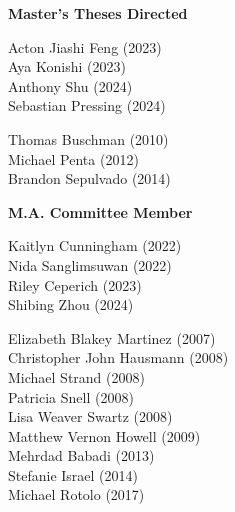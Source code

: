 
\noindent \textbf{Master's Theses Directed}

    \begin{multicols}{2}
    \noindent
    Acton Jiashi Feng (2023) \\
    Aya Konishi (2023)  \\ 	
    Anthony Shu (2024) \\
    Sebastian Pressing (2024)
\end{multicols}

    \begin{multicols}{2}
    \noindent
    Thomas Buschman (2010) \\
    Michael Penta (2012)  \\ 	
    Brandon Sepulvado (2014)
\end{multicols}
\newpage
\noindent \textbf{M.A. Committee Member}  

\begin{multicols}{2}
    \noindent
    Kaitlyn Cunningham (2022) \\
    Nida Sanglimsuwan (2022) \\
    Riley Ceperich (2023) \\
    Shibing Zhou (2024) 
\end{multicols}

\medskip
{}
\begin{multicols}{2}
    \noindent
    Elizabeth Blakey Martinez (2007) \\
    Christopher John Hausmann (2008) \\
    Michael Strand (2008) \\
    Patricia Snell (2008) \\
    Lisa Weaver Swartz (2008) \\
    Matthew Vernon Howell (2009) \\
    Mehrdad Babadi (2013) \\
    Stefanie Israel (2014) \\
    Michael Rotolo (2017)
\end{multicols}